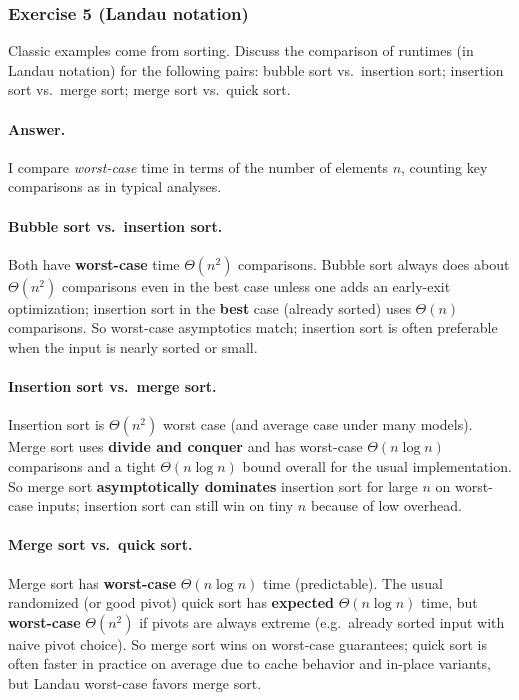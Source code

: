 \documentclass{article}
\theoremstyle{theorem}
\theoremstyle{definition}
\theoremstyle{remark}
\begin{document}
\subsubsection*{Exercise 5 (Landau notation)}
Classic examples come from sorting. Discuss the comparison of runtimes (in Landau notation) for the following pairs: bubble sort vs.\ insertion sort; insertion sort vs.\ merge sort; merge sort vs.\ quick sort.

\paragraph{Answer.}
I compare \emph{worst-case} time in terms of the number of elements $n$, counting key comparisons as in typical analyses.

\paragraph{Bubble sort vs.\ insertion sort.}
Both have \textbf{worst-case} time $\Theta(n^2)$ comparisons. Bubble sort always does about $\Theta(n^2)$ comparisons even in the best case unless one adds an early-exit optimization; insertion sort in the \textbf{best} case (already sorted) uses $\Theta(n)$ comparisons. So worst-case asymptotics match; insertion sort is often preferable when the input is nearly sorted or small.

\paragraph{Insertion sort vs.\ merge sort.}
Insertion sort is $\Theta(n^2)$ worst case (and average case under many models). Merge sort uses \textbf{divide and conquer} and has worst-case $\Theta(n \log n)$ comparisons and a tight $\Theta(n \log n)$ bound overall for the usual implementation. So merge sort \textbf{asymptotically dominates} insertion sort for large $n$ on worst-case inputs; insertion sort can still win on tiny $n$ because of low overhead.

\paragraph{Merge sort vs.\ quick sort.}
Merge sort has \textbf{worst-case} $\Theta(n \log n)$ time (predictable). The usual randomized (or good pivot) quick sort has \textbf{expected} $\Theta(n \log n)$ time, but \textbf{worst-case} $\Theta(n^2)$ if pivots are always extreme (e.g.\ already sorted input with naive pivot choice). So merge sort wins on worst-case guarantees; quick sort is often faster in practice on average due to cache behavior and in-place variants, but Landau worst-case favors merge sort.
\end{document}
